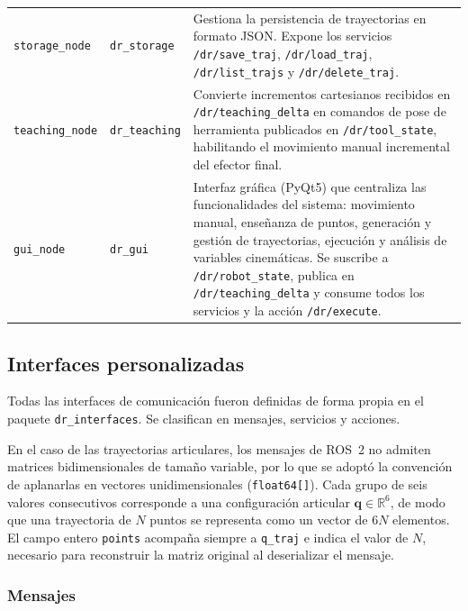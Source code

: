\documentclass{article}
\begin{document}
\begin{table}[H]
{\begin{tabular}{l l p{7.5cm}}
        \texttt{storage\_node} & \texttt{dr\_storage} &
            Gestiona la persistencia de trayectorias en formato JSON. Expone los servicios \texttt{/dr/save\_traj}, \texttt{/dr/load\_traj}, \texttt{/dr/list\_trajs} y \texttt{/dr/delete\_traj}. \\

        \texttt{teaching\_node} & \texttt{dr\_teaching} &
            Convierte incrementos cartesianos recibidos en \texttt{/dr/\allowbreak teaching\_delta} en comandos de pose de herramienta publicados en \texttt{/dr/tool\_state}, habilitando el movimiento manual incremental del efector final. \\

        \texttt{gui\_node} & \texttt{dr\_gui} &
            Interfaz gráfica (PyQt5) que centraliza las funcionalidades del sistema: movimiento manual, enseñanza de puntos, generación y gestión de trayectorias, ejecución y análisis de variables cinemáticas. Se suscribe a \texttt{/dr/robot\_state}, publica en \texttt{/dr/teaching\_delta} y consume todos los servicios y la acción \texttt{/dr/execute}. \\

   \end{tabular}%
    }
\end{table}

\subsection{Interfaces personalizadas}
\label{sec:ros2_interfaces}

Todas las interfaces de comunicación fueron definidas de forma propia en el paquete \texttt{dr\_interfaces}. Se clasifican en mensajes, servicios y acciones.

En el caso de las trayectorias articulares, los mensajes de ROS~2 no admiten matrices bidimensionales de tamaño variable, por lo que se adoptó la convención de aplanarlas en vectores unidimensionales (\texttt{float64[]}). Cada grupo de seis valores consecutivos corresponde a una configuración articular $\mathbf{q} \in \mathbb{R}^6$, de modo que una trayectoria de $N$ puntos se representa como un vector de $6N$ elementos. El campo entero \texttt{points} acompaña siempre a \texttt{q\_traj} e indica el valor de $N$, necesario para reconstruir la matriz original al deserializar el mensaje.

\subsubsection*{Mensajes}
\end{document}
